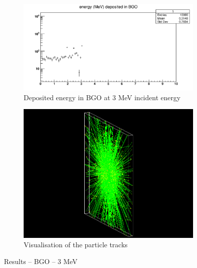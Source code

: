 \documentclass{article}
\begin{document}
\begin{figure}[H]
\centering
\begin{subfigure}{.5\textwidth}
  \centering
  \includegraphics[width=\linewidth]{images/task1/BGO_3MeV.png}
  \caption{Deposited energy in BGO at 3 MeV incident energy}
\end{subfigure}%
\begin{subfigure}{.5\textwidth}
  \centering
  \includegraphics[width=\linewidth]{images/task1/BGO_3MeV_10000.png}
  \caption{Visualisation of the particle tracks}
\end{subfigure}
\caption{Results – BGO – 3 MeV}
\end{figure}
\end{document}
